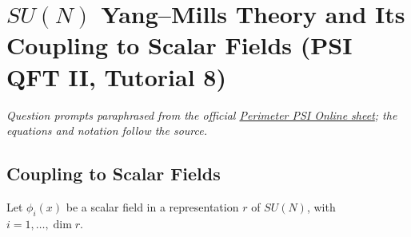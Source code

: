 \section{$SU(N)$ Yang--Mills Theory and Its Coupling to Scalar Fields (PSI QFT II, Tutorial 8)}

\noindent\textit{Question prompts paraphrased from the official
\href{https://psi-online.perimeterinstitute.ca/courses/take/quantum-field-theory-ii-student/pdfs/20776405-module-7-tutorial}{Perimeter PSI Online sheet};
the equations and notation follow the source.}

\subsection{Coupling to Scalar Fields}

Let $\phi_i(x)$ be a scalar field in a representation $r$ of $SU(N)$, with
$i=1,\ldots,\dim r$.

